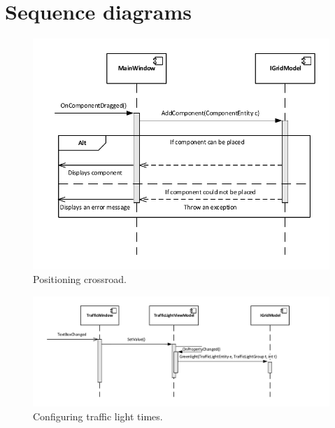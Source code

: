 \section{Sequence diagrams}
\begin{figure}[!ht]
	\centering
	\includegraphics{figures/PosititioningCrossroad}
	\caption{Positioning crossroad.}
\end{figure}

\begin{figure}[!ht]
	\centering
	\includegraphics{figures/ConfigTrafficLight}
	\caption{Configuring traffic light times.}
\end{figure}

